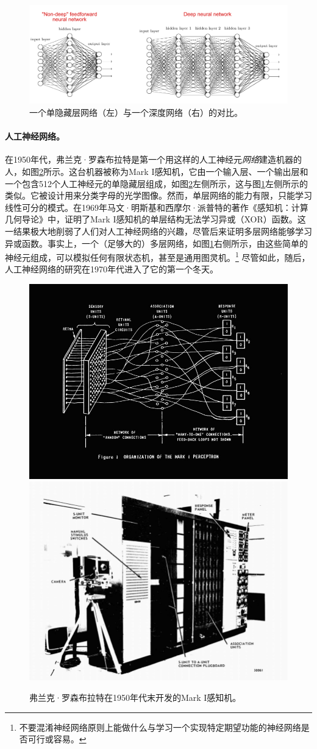 \documentclass[../../book-main.tex]{subfiles}
\begin{document}
\begin{figure}[t]
\centering
\includegraphics[width=0.85\linewidth]{figures/single-deep.png}
    \caption{一个单隐藏层网络（左）与一个深度网络（右）的对比。}
    \label{fig:single-deep}
\end{figure}
\paragraph{人工神经网络。}
在1950年代，弗兰克·罗森布拉特是第一个用这样的人工神经元{\em 网络}建造机器的人，如图\ref{fig:perceptron}所示。这台机器被称为Mark I感知机，它由一个输入层、一个输出层和一个包含512个人工神经元的单隐藏层组成，如图\ref{fig:perceptron}左侧所示，这与图\ref{fig:single-deep}左侧所示的类似。它被设计用来分类字母的光学图像。然而，单层网络的能力有限，只能学习线性可分的模式。在1969年马文·明斯基和西摩尔·派普特的著作《感知机：计算几何导论》\cite{Minsky-1969}中，证明了Mark I感知机的单层结构无法学习异或（XOR）函数。这一结果极大地削弱了人们对人工神经网络的兴趣，尽管后来证明多层网络能够学习异或函数\cite{Rumelhart1986}。事实上，一个（足够大的）多层网络，如图\ref{fig:single-deep}右侧所示，由这些简单的神经元组成，可以模拟任何有限状态机，甚至是通用图灵机。\footnote{不要混淆神经网络原则上能做什么与学习一个实现特定期望功能的神经网络是否可行或容易。} 尽管如此，随后，人工神经网络的研究在1970年代进入了它的第一个冬天。

\begin{figure}
    \centering
    \includegraphics[width=0.45\linewidth]{figures/visu-large.jpg}
    \hspace{2mm} \includegraphics[width=0.45\linewidth]{figures/Original-Mark-I-perceptron-as-seen-in-its-operators-manual-20.ppm.png}
    \caption{弗兰克·罗森布拉特在1950年代末开发的Mark I感知机。}
    \label{fig:perceptron}
\end{figure}
\end{document}
